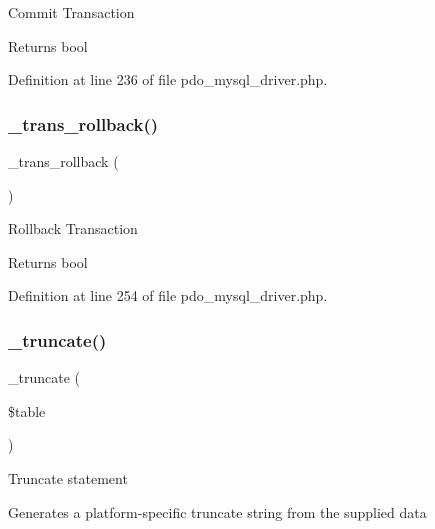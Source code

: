 Commit Transaction

\begin{DoxyReturn}{Returns}
bool 
\end{DoxyReturn}


Definition at line 236 of file pdo\+\_\+mysql\+\_\+driver.\+php.

\mbox{\label{class_c_i___d_b__pdo__mysql__driver_ad49a116b0776c26b53114c9093fd102a}} 
\subsubsection{\texorpdfstring{\_trans\_rollback()}{\_trans\_rollback()}}
{\footnotesize\ttfamily \+\_\+trans\+\_\+rollback (\begin{DoxyParamCaption}{ }\end{DoxyParamCaption})\hspace{0.3cm}{\ttfamily [protected]}}

Rollback Transaction

\begin{DoxyReturn}{Returns}
bool 
\end{DoxyReturn}


Definition at line 254 of file pdo\+\_\+mysql\+\_\+driver.\+php.

\mbox{\label{class_c_i___d_b__pdo__mysql__driver_aa029600528fc1ce660a23ff4b4667f95}} 
\subsubsection{\texorpdfstring{\_truncate()}{\_truncate()}}
{\footnotesize\ttfamily \+\_\+truncate (\begin{DoxyParamCaption}\item[{}]{\$table }\end{DoxyParamCaption})\hspace{0.3cm}{\ttfamily [protected]}}

Truncate statement

Generates a platform-\/specific truncate string from the supplied data

